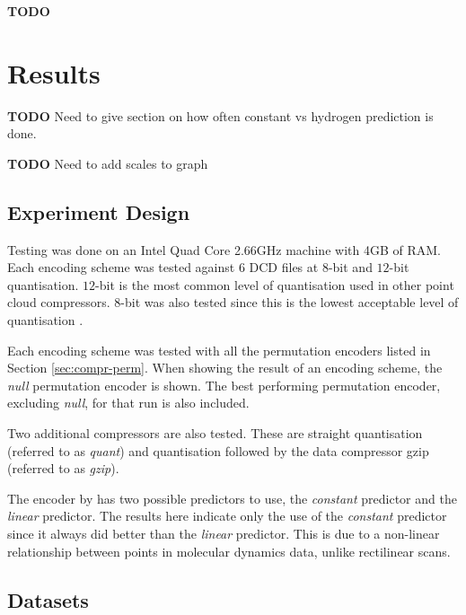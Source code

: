 \documentclass[a4paper]{report}
\newcommand{\todo}{\textbf{TODO} }
\begin{document}
\todo


\chapter{Results}

\todo Need to give section on how often constant vs hydrogen prediction is
done.

\todo Need to add scales to graph

\section{Experiment Design}

Testing was done on an Intel Quad Core 2.66GHz machine with 4GB of RAM. Each
encoding scheme was tested against 6 DCD files at $8$-bit and $12$-bit
quantisation. $12$-bit is the most common level of quantisation used in other
point cloud compressors. $8$-bit was also tested since this is the lowest
acceptable level of quantisation \citep{minvis}.

Each encoding scheme was tested with all the permutation encoders listed in
Section \ref{sec:compr-perm}. When showing the result of an encoding scheme,
the \emph{null} permutation encoder is shown. The best performing permutation
encoder, excluding \emph{null}, for that run is also included.

Two additional compressors are also tested. These are straight quantisation
(referred to as \emph{quant}) and quantisation followed by the data compressor
gzip (referred to as \emph{gzip}).

The encoder by \citet{gumholdcomp} has two possible predictors to use, the
\emph{constant} predictor and the \emph{linear} predictor. The results here
indicate only the use of the \emph{constant} predictor since it always did
better than the \emph{linear} predictor. This is due to a non-linear
relationship between points in molecular dynamics data, unlike rectilinear
scans.

\section{Datasets}
\end{document}
